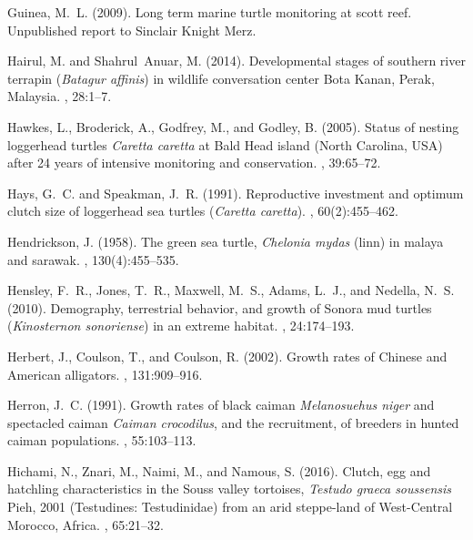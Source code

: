 \documentclass{article}
\begin{document}
\begin{thebibliography}{}
Guinea, M.~L. (2009).
\newblock Long term marine turtle monitoring at scott reef.
\newblock Unpublished report to Sinclair Knight Merz.

Hairul, M. and Shahrul~Anuar, M. (2014).
\newblock Developmental stages of southern river terrapin (\emph{Batagur
  affinis}) in wildlife conversation center {B}ota {K}anan, {P}erak,
  {M}alaysia.
, 28:1--7.

Hawkes, L., Broderick, A., Godfrey, M., and Godley, B. (2005).
\newblock Status of nesting loggerhead turtles \textit{Caretta caretta} at
  {B}ald {H}ead island ({N}orth {C}arolina, {U}{S}{A}) after 24 years of
  intensive monitoring and conservation.
, 39:65--72.

Hays, G.~C. and Speakman, J.~R. (1991).
\newblock Reproductive investment and optimum clutch size of loggerhead sea
  turtles (\textit{Caretta caretta}).
, 60(2):455--462.

Hendrickson, J. (1958).
\newblock The green sea turtle, \emph{Chelonia mydas} (linn) in malaya and
  sarawak.
, 130(4):455--535.

Hensley, F.~R., Jones, T.~R., Maxwell, M.~S., Adams, L.~J., and Nedella, N.~S.
  (2010).
\newblock Demography, terrestrial behavior, and growth of {S}onora mud turtles
  (\emph{Kinosternon sonoriense}) in an extreme habitat.
, 24:174--193.

Herbert, J., Coulson, T., and Coulson, R. (2002).
\newblock Growth rates of {C}hinese and {A}merican alligators.
, 131:909–916.

Herron, J.~C. (1991).
\newblock Growth rates of black caiman \emph{Melanosuehus niger} and spectacled
  caiman \emph{Caiman crocodilus}, and the recruitment, of breeders in hunted
  caiman populations.
, 55:103--113.

Hichami, N., Znari, M., Naimi, M., and Namous, S. (2016).
\newblock Clutch, egg and hatchling characteristics in the {S}ouss valley
  tortoises, \emph{Testudo graeca soussensis} {P}ieh, 2001 ({T}estudines:
  {T}estudinidae) from an arid steppe-land of {W}est-{C}entral {M}orocco,
  {A}frica.
, 65:21--32.


\end{thebibliography}
\end{document}
